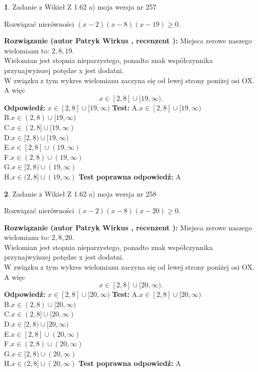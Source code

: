 \documentclass[12pt, a4paper]{article}
\theoremstyle{definition} %
\newtheorem{zad}{}
\newcommand{\zadStart}[1]{\begin{zad}#1\newline}
\newcommand{\zadStop}{\end{zad}}
\newcommand{\rozwStart}[2]{\noindent \textbf{Rozwiązanie (autor #1 , recenzent #2): }\newline}
\newcommand{\rozwStop}{\newline}
\newcommand{\odpStart}{\noindent \textbf{Odpowiedź:}\newline}
\newcommand{\odpStop}{\newline}
\newcommand{\testStart}{\noindent \textbf{Test:}\newline}
\newcommand{\testStop}{\newline}
\newcommand{\kluczStart}{\noindent \textbf{Test poprawna odpowiedź:}\newline}
\newcommand{\kluczStop}{\newline}
\begin{document}
\zadStart{Zadanie z Wikieł Z 1.62 a) moja wersja nr 257}

Rozwiązać nierówności $(x-2)(x-8)(x-19)\ge0$.
\zadStop
\rozwStart{Patryk Wirkus}{}
Miejsca zerowe naszego wielomianu to: $2, 8, 19$.\\
Wielomian jest stopnia nieparzystego, ponadto znak współczynnika przy\linebreak najwyższej potędze x jest dodatni.\\ W związku z tym wykres wielomianu zaczyna się od lewej strony poniżej osi OX. A więc $$x \in [2,8] \cup [19,\infty).$$
\rozwStop
\odpStart
$x \in [2,8] \cup [19,\infty)$
\odpStop
\testStart
A.$x \in [2,8] \cup [19,\infty)$\\
B.$x \in (2,8) \cup [19,\infty)$\\
C.$x \in (2,8] \cup [19,\infty)$\\
D.$x \in [2,8) \cup [19,\infty)$\\
E.$x \in [2,8] \cup (19,\infty)$\\
F.$x \in (2,8) \cup (19,\infty)$\\
G.$x \in [2,8) \cup (19,\infty)$\\
H.$x \in (2,8] \cup (19,\infty)$
\testStop
\kluczStart
A
\kluczStop



\zadStart{Zadanie z Wikieł Z 1.62 a) moja wersja nr 258}

Rozwiązać nierówności $(x-2)(x-8)(x-20)\ge0$.
\zadStop
\rozwStart{Patryk Wirkus}{}
Miejsca zerowe naszego wielomianu to: $2, 8, 20$.\\
Wielomian jest stopnia nieparzystego, ponadto znak współczynnika przy\linebreak najwyższej potędze x jest dodatni.\\ W związku z tym wykres wielomianu zaczyna się od lewej strony poniżej osi OX. A więc $$x \in [2,8] \cup [20,\infty).$$
\rozwStop
\odpStart
$x \in [2,8] \cup [20,\infty)$
\odpStop
\testStart
A.$x \in [2,8] \cup [20,\infty)$\\
B.$x \in (2,8) \cup [20,\infty)$\\
C.$x \in (2,8] \cup [20,\infty)$\\
D.$x \in [2,8) \cup [20,\infty)$\\
E.$x \in [2,8] \cup (20,\infty)$\\
F.$x \in (2,8) \cup (20,\infty)$\\
G.$x \in [2,8) \cup (20,\infty)$\\
H.$x \in (2,8] \cup (20,\infty)$
\testStop
\kluczStart
A
\kluczStop
\end{document}
